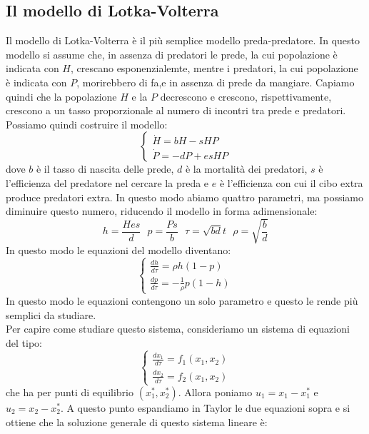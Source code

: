 \documentclass[12pt]{article}
\begin{document}
\subsection{Il modello di Lotka-Volterra}
Il modello di Lotka-Volterra è il più semplice modello preda-predatore. In questo modello si assume che, in assenza di predatori le prede, la cui popolazione è indicata con $H$, crescano esponenzialemte, mentre i predatori, la cui popolazione è indicata con $P$, morirebbero di fa,e in assenza di prede da mangiare. Capiamo quindi che la popolazione $H$ e la $P$ decrescono e crescono, rispettivamente, crescono a un tasso proporzionale al numero di incontri tra prede e predatori. Possiamo quindi costruire il modello:
\begin{equation}
	\begin{cases}
		\dot{H} = bH - sHP \\
		\dot{P} = -dP + esHP
	\end{cases}
\end{equation}
dove $b$ è il tasso di nascita delle prede, $d$ è la mortalità dei predatori, $s$ è l'efficienza del predatore nel cercare la preda e $e$ è l'efficienza con cui il cibo extra produce predatori extra. In questo modo abiamo quattro parametri, ma possiamo diminuire questo numero, riducendo il modello in forma adimensionale:
\begin{equation}
	h = \frac{Hes}{d} \ \ \ p = \frac{Ps}{b} \ \ \ \tau = \sqrt{bd}t \ \ \ \rho = \sqrt{\frac{b}{d}}
\end{equation}
In questo modo le equazioni del modello diventano:
\begin{equation}
	\begin{cases}
		\frac{dh}{d\tau} =  \rho h (1-p)\\
		\frac{dp}{d\tau} = -\frac{1}{\rho} p(1-h)
	\end{cases}
\end{equation}
In questo modo le equazioni contengono un solo parametro e questo le rende più semplici da studiare. \\
Per capire come studiare questo sistema, consideriamo un sistema di equazioni del tipo:
\begin{equation}
	\begin{cases}
		\frac{dx_1}{d\tau} = f_1(x_1,x_2) \\
		\frac{dx_2}{d\tau} = f_2(x_1,x_2)
	\end{cases}
\end{equation}
che ha per punti di equilibrio $(x^*_1,x^*_2)$. Allora poniamo $u_1 = x_1-x^*_1$ e $u_2 = x_2-x^*_2$. A questo punto espandiamo in Taylor le due equazioni sopra e si ottiene che la soluzione generale di questo sistema lineare è:
\end{document}
